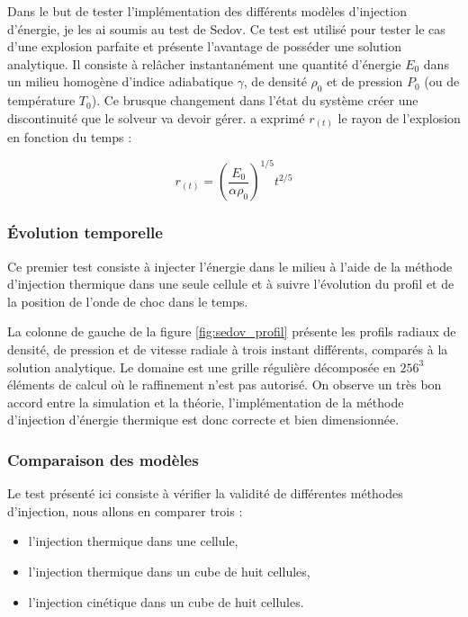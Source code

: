 Dans le but de tester l'implémentation des différents modèles d'injection d'énergie, je les ai soumis au test de Sedov.
Ce test est utilisé pour tester le cas d'une explosion parfaite et présente l'avantage de posséder une solution analytique.
Il consiste à relâcher instantanément une quantité d'énergie $E_0$ dans un milieu homogène d'indice adiabatique $\gamma$, de densité $\rho_0$ et de pression $P_0$ (ou de température $T_0$).
Ce brusque changement dans l'état du système créer une discontinuité que le solveur va devoir gérer.
\cite{sedov_similarity_1959} a exprimé $r_{(t)}$ le rayon de l'explosion en fonction du temps  : 

\begin{equation}
r_{(t)}=\left( \frac{E_0}{\alpha \rho_0 }\right)^{1/5} t^{2/5}
\end{equation}


\subsubsection{Évolution temporelle }


Ce premier test consiste à injecter l'énergie dans le milieu à l'aide de la méthode d'injection thermique dans une seule cellule et à suivre l'évolution du profil et de la position de l'onde de choc dans le temps.

La colonne de gauche de la figure \ref{fig:sedov_profil} présente les profils radiaux de densité, de pression et de vitesse radiale à trois instant différents, comparés à la solution analytique.
Le domaine est une grille régulière décomposée en $256^3$ éléments de calcul où le raffinement n'est pas autorisé.
On observe un très bon accord entre la simulation et la théorie, l'implémentation de la méthode d'injection d'énergie thermique est donc correcte et bien dimensionnée.

\subsubsection{Comparaison des modèles}

Le test présenté ici consiste à vérifier la validité de différentes méthodes d'injection, nous allons en comparer trois : 
\begin{itemize}
\item l'injection thermique dans une cellule,
\item l'injection thermique dans un cube de huit cellules,
\item l'injection cinétique dans un cube de huit cellules.
\end{itemize}

